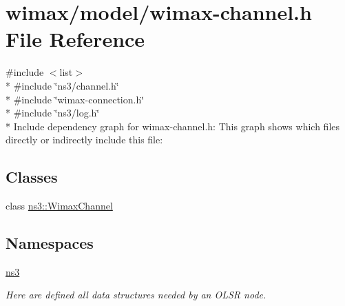 \hypertarget{wimax-channel_8h}{}\section{wimax/model/wimax-\/channel.h File Reference}
\label{wimax-channel_8h}
{\ttfamily \#include $<$list$>$}\\*
{\ttfamily \#include \char`\"{}ns3/channel.\+h\char`\"{}}\\*
{\ttfamily \#include \char`\"{}wimax-\/connection.\+h\char`\"{}}\\*
{\ttfamily \#include \char`\"{}ns3/log.\+h\char`\"{}}\\*
Include dependency graph for wimax-\/channel.h\+:
This graph shows which files directly or indirectly include this file\+:
\subsection*{Classes}
\begin{DoxyCompactItemize}
\item 
class \hyperlink{classns3_1_1WimaxChannel}{ns3\+::\+Wimax\+Channel}
\end{DoxyCompactItemize}
\subsection*{Namespaces}
\begin{DoxyCompactItemize}
\item 
 \hyperlink{namespacens3}{ns3}
\begin{DoxyCompactList}\small\item\em Here are defined all data structures needed by an O\+L\+SR node. \end{DoxyCompactList}\end{DoxyCompactItemize}
